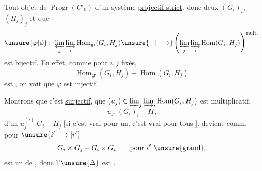 Tout objet de $\operatorname{Progr}(C'_0)$  d'un système \uline{projectif strict}.  donc deux $(G_i)_i$, $(H_j)_j$ et  que
\[
\unsure{\varphi|\phi}:\ \varprojlim_j\varinjlim_i\operatorname{Hom}_{\mathrm{gr}}(G_i,H_j)
\unsure{-|\longrightarrow}
\left(\varprojlim_j\varinjlim_i\operatorname{Hom}(G_i,H_j)\right)^{\mathrm{mult.}}
\]
est \uline{bijectif}. En effet, comme pour $i,j$ fixés,
\[
\operatorname{Hom}_{\mathrm{gr}}(G_i,H_j)-\operatorname{Hom}(G_i,H_j)
\]
est , on voit que $\varphi$ est \uline{injectif}. 

Montrons que c'est \uline{surjectif},   que  $(u_j)\in\varprojlim_j\varinjlim_i\operatorname{Hom}(G_i,H_j)$ est multiplicatif, 
\[
u_j:(G_i)_i-H_j
\]
 d'un $u_j^{(i)}\ G_i-H_j$  
[si c'est vrai pour un, c'est vrai pour tous ].
 devient comm. pour $\unsure{i'\longrightarrow|i'}$ 
\[
G_j\times G_j-G_i\times G_i\qquad\text{pour }i'\ \text{\unsure{grand},}
\]
 \uline{est un  de }, donc l'$\unsure{\Delta}$ est  .
